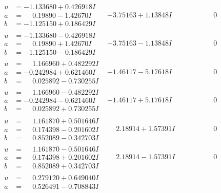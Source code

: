 \documentclass[1p]{elsarticle_modified}
\theoremstyle{definition}
\begin{document}
$$\begin{array}{c|c|c}
 \hline 
\begin{aligned}
u &= -1.133680 + 0.426918 I \\
a &= \phantom{-}0.19890 - 1.42670 I \\
b &= -1.125150 + 0.186429 I\end{aligned}
 & -3.75163 + 1.13848 I & \phantom{-0.000000 } 0 \\ \hline\begin{aligned}
u &= -1.133680 - 0.426918 I \\
a &= \phantom{-}0.19890 + 1.42670 I \\
b &= -1.125150 - 0.186429 I\end{aligned}
 & -3.75163 - 1.13848 I & \phantom{-0.000000 } 0 \\ \hline\begin{aligned}
u &= \phantom{-}1.166960 + 0.482292 I \\
a &= -0.242984 + 0.621460 I \\
b &= \phantom{-}0.025892 - 0.730255 I\end{aligned}
 & -1.46117 - 5.17618 I & \phantom{-0.000000 } 0 \\ \hline\begin{aligned}
u &= \phantom{-}1.166960 - 0.482292 I \\
a &= -0.242984 - 0.621460 I \\
b &= \phantom{-}0.025892 + 0.730255 I\end{aligned}
 & -1.46117 + 5.17618 I & \phantom{-0.000000 } 0 \\ \hline\begin{aligned}
u &= \phantom{-}1.161870 + 0.501646 I \\
a &= \phantom{-}0.174398 - 0.201602 I \\
b &= \phantom{-}0.852089 - 0.342703 I\end{aligned}
 & \phantom{-}2.18914 + 1.57391 I & \phantom{-0.000000 } 0 \\ \hline\begin{aligned}
u &= \phantom{-}1.161870 - 0.501646 I \\
a &= \phantom{-}0.174398 + 0.201602 I \\
b &= \phantom{-}0.852089 + 0.342703 I\end{aligned}
 & \phantom{-}2.18914 - 1.57391 I & \phantom{-0.000000 } 0 \\ \hline\begin{aligned}
u &= \phantom{-}0.279120 + 0.649040 I \\
a &= \phantom{-}0.526491 - 0.708843 I \\

\end{aligned}
\end{array}$$
\end{document}
